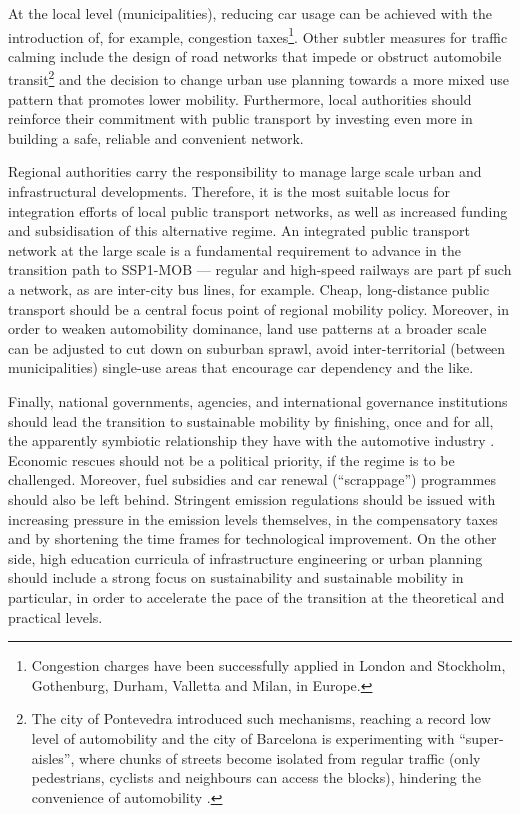 At the local level (municipalities), reducing car usage can be achieved with the introduction of, for example, congestion taxes\footnote{Congestion charges have been successfully applied in London and Stockholm, Gothenburg, Durham, Valletta and Milan, in Europe.}. Other subtler measures for traffic calming include the design of road networks that impede or obstruct automobile transit\footnote{The city of Pontevedra introduced such mechanisms, reaching a record low level of automobility \parencite{precedo2017_Pontevedraelsueno} and the city of Barcelona is experimenting with ``super-aisles'', where chunks of streets become isolated from regular traffic (only pedestrians, cyclists and neighbours can access the blocks), hindering the convenience of automobility \parencite{ajuntamentbarcelona2016_OmplimdeVida}.} and the decision to change urban use planning towards a more mixed use pattern that promotes lower mobility. Furthermore, local authorities should reinforce their commitment with public transport by investing even more in building a safe, reliable and convenient network.

Regional authorities carry the responsibility to manage large scale urban and infrastructural developments. Therefore, it is the most suitable locus for integration efforts of local public transport networks, as well as increased funding and subsidisation of this alternative regime. An integrated public transport network at the large scale is a fundamental requirement to advance in the transition path to SSP1-MOB --- regular and high-speed railways are part pf such a network, as are inter-city bus lines, for example. Cheap, long-distance public transport should be a central focus point of regional mobility policy. Moreover, in order to weaken automobility dominance, land use patterns at a broader scale can be adjusted to cut down on suburban sprawl, avoid inter-territorial (between municipalities) single-use areas that encourage car dependency and the like.

Finally, national governments, agencies, and international governance institutions should lead the transition to sustainable mobility by finishing, once and for all, the apparently symbiotic relationship they have with the automotive industry \parencite{wells2012_TransitionfailureUnderstanding,sturgeon2009_CrisisProtectionAutomotive}. Economic rescues should not be a political priority, if the regime is to be challenged. Moreover, fuel subsidies and car renewal (``scrappage'') programmes should also be left behind. Stringent emission regulations should be issued with increasing pressure in the emission levels themselves, in the compensatory taxes and by shortening the time frames for technological improvement. On the other side, high education curricula of infrastructure engineering or urban planning should include a strong focus on sustainability and sustainable mobility in particular, in order to accelerate the pace of the transition at the theoretical and practical levels.

